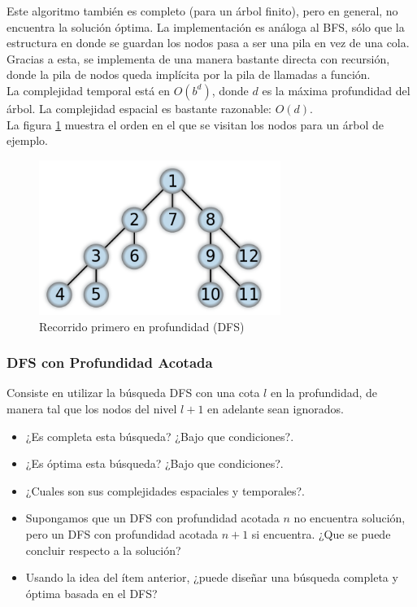 \documentclass[11pt,a4paper]{article}
\begin{document}
Este algoritmo también es completo (para un árbol finito), pero en general, no encuentra la solución óptima. La implementación es análoga al BFS, sólo que la estructura en donde se guardan los nodos pasa a ser una pila en vez de una cola. Gracias a esta, se implementa de una manera bastante directa con recursión, donde la pila de nodos queda implícita por la pila de llamadas a función. \\

La complejidad temporal está en $O(b^{d})$, donde $d$ es la máxima profundidad del árbol. La complejidad espacial es bastante razonable: $O(d)$. \\

La figura \ref{fig:DFS} muestra el orden en el que se visitan los nodos para un árbol de ejemplo.

{
\begin{figure}[]
  \centering
    \includegraphics[width=0.7\textwidth]{img/DFS}
  \caption{Recorrido primero en profundidad (DFS)}
  \label{fig:DFS}
\end{figure}
}

\subsubsection{DFS con Profundidad Acotada}
Consiste en utilizar la búsqueda DFS con una cota $l$ en la profundidad, de manera tal que los nodos del nivel $l+1$ en adelante sean ignorados. 
\begin{itemize}
\item ¿Es completa esta búsqueda? ¿Bajo que condiciones?.
\item ¿Es óptima esta búsqueda? ¿Bajo que condiciones?.
\item ¿Cuales son sus complejidades espaciales y temporales?.
\item Supongamos que un DFS con profundidad acotada $n$ no encuentra solución, pero un DFS con profundidad acotada $n+1$ si encuentra. ¿Que se puede concluir respecto a la solución? 
\item Usando la idea del ítem anterior, ¿puede diseñar una búsqueda completa y óptima basada en el DFS?
\end{itemize}
\end{document}
